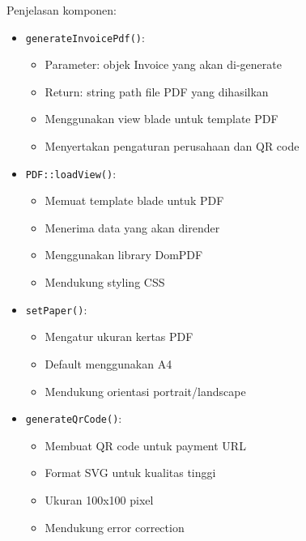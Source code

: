 \documentclass[a4paper]{report}
\begin{document}
Penjelasan komponen:
\begin{itemize}
\item \texttt{generateInvoicePdf()}:
    \begin{itemize}
    \item Parameter: objek Invoice yang akan di-generate
    \item Return: string path file PDF yang dihasilkan
    \item Menggunakan view blade untuk template PDF
    \item Menyertakan pengaturan perusahaan dan QR code
    \end{itemize}

\item \texttt{PDF::loadView()}:
    \begin{itemize}
    \item Memuat template blade untuk PDF
    \item Menerima data yang akan dirender
    \item Menggunakan library DomPDF
    \item Mendukung styling CSS
    \end{itemize}

\item \texttt{setPaper()}:
    \begin{itemize}
    \item Mengatur ukuran kertas PDF
    \item Default menggunakan A4
    \item Mendukung orientasi portrait/landscape
    \end{itemize}

\item \texttt{generateQrCode()}:
    \begin{itemize}
    \item Membuat QR code untuk payment URL
    \item Format SVG untuk kualitas tinggi
    \item Ukuran 100x100 pixel
    \item Mendukung error correction
    \end{itemize}
\end{itemize}
\end{document}
